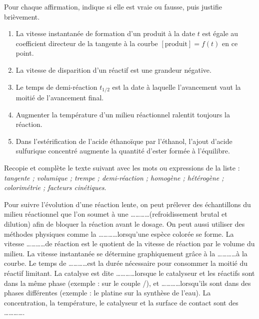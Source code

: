 \documentclass[11pt]{article}
\begin{document}
\begin{exercice}
Pour chaque affirmation, indique si elle est vraie ou fausse, puis justifie brièvement.
\begin{enumerate}
\item La vitesse instantanée de formation d'un produit à la date $t$ est égale au coefficient directeur de la tangente à la courbe $[\text{produit}] = f(t)$ en ce point.
\item La vitesse de disparition d'un réactif est une grandeur négative.
\item Le temps de demi-réaction $t_{1/2}$ est la date à laquelle l'avancement vaut la moitié de l'avancement final.
\item Augmenter la température d'un milieu réactionnel ralentit toujours la réaction.
\item Dans l'estérification de l'acide éthanoïque par l'éthanol, l'ajout d'acide sulfurique concentré augmente la quantité d'ester formée à l'équilibre.
\end{enumerate}
\end{exercice}

\begin{exercice}
Recopie et complète le texte suivant avec les mots ou expressions de la liste : \emph{tangente ; volumique ; trempe ; demi-réaction ; homogène ; hétérogène ; colorimétrie ; facteurs cinétiques}.

\medskip
Pour suivre l'évolution d'une réaction lente, on peut prélever des échantillons du milieu réactionnel que l'on soumet à une \ldots\ldots\ldots\ldots (refroidissement brutal et dilution) afin de bloquer la réaction avant le dosage. On peut aussi utiliser des méthodes physiques comme la \ldots\ldots\ldots\ldots lorsqu'une espèce colorée se forme. La vitesse \ldots\ldots\ldots\ldots de réaction est le quotient de la vitesse de réaction par le volume du milieu. La vitesse instantanée se détermine graphiquement grâce à la \ldots\ldots\ldots\ldots à la courbe. Le temps de \ldots\ldots\ldots\ldots est la durée nécessaire pour consommer la moitié du réactif limitant. La catalyse est dite \ldots\ldots\ldots\ldots lorsque le catalyseur et les réactifs sont dans la même phase (exemple :  sur le couple /), et \ldots\ldots\ldots\ldots lorsqu'ils sont dans des phases différentes (exemple : le platine sur la synthèse de l'eau). La concentration, la température, le catalyseur et la surface de contact sont des \ldots\ldots\ldots\ldots .
\end{exercice}
\end{document}
